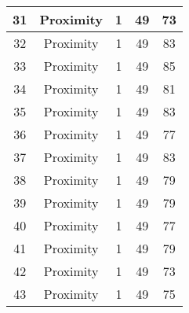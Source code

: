 \documentclass[results.tex]{subfiles}
\begin{document}
\begin{center}
\begin{tabular}{| c || c | c | c | c |}
            \hline
            31                      & Proximity                    & 1                      & 49                      & 73                   \\
            \hline
            32                      & Proximity                    & 1                      & 49                      & 83                   \\
            \hline
            33                      & Proximity                    & 1                      & 49                      & 85                   \\
            \hline
            34                      & Proximity                    & 1                      & 49                      & 81                   \\
            \hline
            35                      & Proximity                    & 1                      & 49                      & 83                   \\
            \hline
            36                      & Proximity                    & 1                      & 49                      & 77                   \\
            \hline
            37                      & Proximity                    & 1                      & 49                      & 83                   \\
            \hline
            38                      & Proximity                    & 1                      & 49                      & 79                   \\
            \hline
            39                      & Proximity                    & 1                      & 49                      & 79                   \\
            \hline
            40                      & Proximity                    & 1                      & 49                      & 77                   \\
            \hline
            41                      & Proximity                    & 1                      & 49                      & 79                   \\
            \hline
            42                      & Proximity                    & 1                      & 49                      & 73                   \\
            \hline
            43                      & Proximity                    & 1                      & 49                      & 75                   \\

\end{tabular}
\end{center}
\end{document}
